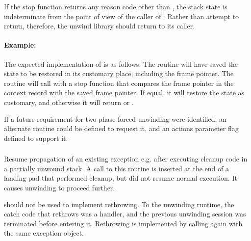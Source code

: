 \begin{sloppypar}
If the stop function returns any reason code other than ,
the stack state is indeterminate from the point of view of the caller of
. Rather than attempt to return, therefore,
the unwind library should return  to its caller.
\end{sloppypar}

\paragraph{Example: \\}

\begin{sloppypar}
The expected implementation of  is as follows.
The  routine will have saved the state to be restored in its
customary place, including the frame pointer. The 
routine will call  with a stop function that
compares the frame pointer in the context record with the saved frame
pointer. If equal, it will restore the  state as customary,
and otherwise it will return  or .
\end{sloppypar}

If a future requirement for two-phase forced unwinding were identified,
an alternate routine could be defined to request it, and an actions
parameter flag defined to support it.

\subsubsection{}


Resume propagation of an existing exception e.g. after executing cleanup
code in a partially unwound stack. A call to this routine is inserted
at the end of a landing pad that performed cleanup, but did not resume
normal execution. It causes unwinding to proceed further.

 should not be used to implement rethrowing.
To the unwinding runtime, the catch code that rethrows was a handler,
and the previous unwinding session was terminated before entering it.
Rethrowing is implemented by calling 
again with the same exception object.


